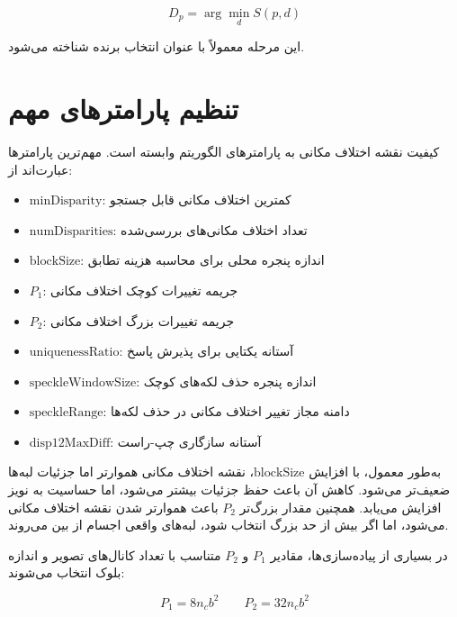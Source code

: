 \begin{equation}
	D_p
	=
	\arg\min_{d}
	S(p,d)
	\label{eq:sgbm_winner_takes_all}
\end{equation}

این مرحله معمولاً با عنوان انتخاب برنده%
شناخته می‌شود.

\section{تنظیم پارامترهای مهم }

کیفیت نقشه اختلاف مکانی به پارامترهای الگوریتم وابسته است. مهم‌ترین پارامترها عبارت‌اند از:

\begin{itemize}
	\item \(\mathrm{minDisparity}\): کمترین اختلاف مکانی قابل جستجو
	\item \(\mathrm{numDisparities}\): تعداد اختلاف مکانی‌های بررسی‌شده
	\item \(\mathrm{blockSize}\): اندازه پنجره محلی برای محاسبه هزینه تطابق
	\item \(P_1\): جریمه تغییرات کوچک اختلاف مکانی
	\item \(P_2\): جریمه تغییرات بزرگ اختلاف مکانی
	\item \(\mathrm{uniquenessRatio}\): آستانه یکتایی برای پذیرش پاسخ
	\item \(\mathrm{speckleWindowSize}\): اندازه پنجره حذف لکه‌های کوچک
	\item \(\mathrm{speckleRange}\): دامنه مجاز تغییر اختلاف مکانی در حذف لکه‌ها
	\item \(\mathrm{disp12MaxDiff}\): آستانه سازگاری چپ-راست
\end{itemize}

به‌طور معمول، با افزایش \(\mathrm{blockSize}\)، نقشه اختلاف مکانی هموارتر اما جزئیات لبه‌ها ضعیف‌تر می‌شود. کاهش آن باعث حفظ جزئیات بیشتر می‌شود، اما حساسیت به نویز افزایش می‌یابد. همچنین مقدار بزرگ‌تر \(P_2\) باعث هموارتر شدن نقشه اختلاف مکانی می‌شود، اما اگر بیش از حد بزرگ انتخاب شود، لبه‌های واقعی اجسام از بین می‌روند.

در بسیاری از پیاده‌سازی‌ها، مقادیر \(P_1\) و \(P_2\) متناسب با تعداد کانال‌های تصویر و اندازه بلوک انتخاب می‌شوند:

\begin{equation}
	P_1 = 8 n_c b^2
	\qquad
	P_2 = 32 n_c b^2
	\label{eq:sgbm_p1_p2}
\end{equation}

